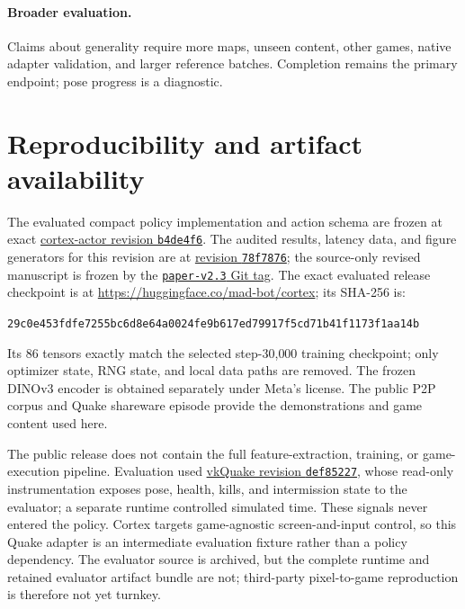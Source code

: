 \documentclass[11pt]{article}
\begin{document}
\paragraph{Broader evaluation.} Claims about generality require more maps, unseen content, other games, native adapter validation, and larger reference batches. Completion remains the primary endpoint; pose progress is a diagnostic.

\section*{Reproducibility and artifact availability}\label{sec:repro}

The evaluated compact policy implementation and action schema are frozen at exact \href{https://github.com/kvark/cortex-actor/tree/b4de4f66420df2c408ec42b5c01c91a088d8b63d}{cortex-actor revision \texttt{b4de4f6}}. The audited results, latency data, and figure generators for this revision are at \href{https://github.com/kvark/cortex-actor/tree/78f78760c3a4b4f145664dd2aa9dd89b553e4d8d}{revision \texttt{78f7876}}; the source-only revised manuscript is frozen by the \href{https://github.com/kvark/cortex-actor/tree/paper-v2.3}{\texttt{paper-v2.3} Git tag}. The exact evaluated release checkpoint is at \url{https://huggingface.co/mad-bot/cortex}; its SHA-256 is:
\begin{center}
\small\texttt{29c0e453fdfe7255bc6d8e64a0024fe9b617ed79917f5cd71b41f1173f1aa14b}
\end{center}
Its 86 tensors exactly match the selected step-30{,}000 training checkpoint; only optimizer state, RNG state, and local data paths are removed. The frozen DINOv3 encoder is obtained separately under Meta's license. The public P2P corpus and Quake shareware episode provide the demonstrations and game content used here.

The public release does not contain the full feature-extraction, training, or game-execution pipeline. Evaluation used \href{https://github.com/kvark/vkQuake/tree/def85227e6089231f23c1fbc2ba5e9c454add833}{vkQuake revision \texttt{def85227}}, whose read-only instrumentation exposes pose, health, kills, and intermission state to the evaluator; a separate runtime controlled simulated time. These signals never entered the policy. Cortex targets game-agnostic screen-and-input control, so this Quake adapter is an intermediate evaluation fixture rather than a policy dependency. The evaluator source is archived, but the complete runtime and retained evaluator artifact bundle are not; third-party pixel-to-game reproduction is therefore not yet turnkey.
\end{document}
